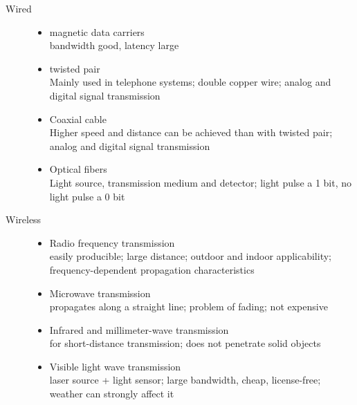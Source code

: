 \documentclass[margin=0px]{article}
\begin{document}
\begin{description}
\begin{description}
            \item[Wired] \hfill
                \begin{itemize}
                    \item magnetic data carriers \\
                          bandwidth good, latency large
                    \item twisted pair \\
                          Mainly used in telephone systems; double copper wire; analog and digital signal transmission
                    \item Coaxial cable\\
                          Higher speed and distance can be achieved than with twisted pair; analog and
                          digital signal transmission
                    \item Optical fibers\\
                          Light source, transmission medium and detector; light pulse a 1 bit, no
                          light pulse a 0 bit
                \end{itemize}
            \item[Wireless] \hfill
                \begin{itemize}
                    \item Radio frequency transmission \\
                          easily producible; large distance; outdoor and indoor applicability; frequency-dependent propagation characteristics
                    \item Microwave transmission\\
                          propagates along a straight line; problem of fading; not expensive
                    \item Infrared and millimeter-wave transmission \\
                          for short-distance transmission; does not penetrate solid objects
                    \item Visible light wave transmission\\
                          laser source + light sensor; large bandwidth, cheap, license-free; weather can strongly affect it
                \end{itemize}
        \end{description}
    \item[Signal transmission] \hfill
        \begin{itemize}

\end{itemize}
\end{description}
\end{document}
